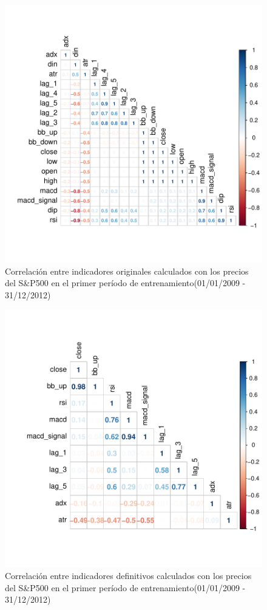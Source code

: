 \documentclass[a4paper,12pt]{Latex/Classes/PhDthesisPSnPDF}
\begin{document}
\begin{figure}[H]
\centering
\includegraphics{main-006}
\caption{Correlación entre indicadores originales calculados con los precios del S\&P500 en el primer período de entrenamiento(01/01/2009 - 31/12/2012)}
\end{figure}


\begin{figure}[H]
\centering
\includegraphics{main-007}
\caption{Correlación entre indicadores definitivos calculados con los precios del S\&P500 en el primer período de entrenamiento(01/01/2009 - 31/12/2012)}
\end{figure}
\end{document}
